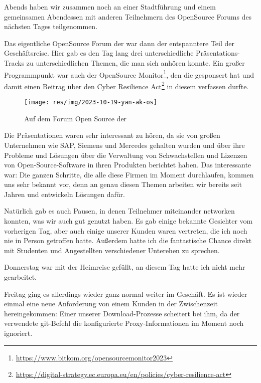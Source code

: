 Abends haben wir zusammen noch an einer Stadtführung und einem gemeinsamen Abendessen mit anderen Teilnehmern des OpenSource Forums des nächsten Tages teilgenommen.

Das eigentliche OpenSource Forum der \bitkom war dann der entspanntere Teil der Geschäftsreise.
Hier gab es den Tag lang drei unterschiedliche Präsentations-Tracks zu unterschiedlichen Themen, die man sich anhören konnte.
Ein großer Programmpunkt war auch der \bitkom OpenSource Monitor\footnote{\url{https://www.bitkom.org/opensourcemonitor2023}}, den die \metaeffekt gesponsert hat und damit einen Beitrag über den Cyber Resilience Act\footnote{\url{https://digital-strategy.ec.europa.eu/en/policies/cyber-resilience-act}} in diesem verfassen durfte.

\begin{figure}[htbp] %
    \centering
    \texttt{[image: res/img/2023-10-19-yan-ak-os]}
    \caption{Auf dem Forum Open Source der }
    \label{fig:yan-foss23}
\end{figure}

Die Präsentationen waren sehr interessant zu hören, da sie von großen Unternehmen wie SAP, Siemens und Mercedes gehalten wurden und über ihre Probleme und Lösungen über die Verwaltung von Schwachstellen und Lizenzen von Open-Source-Software in ihren Produkten berichtet haben.
Das interessante war: Die ganzen Schritte, die alle diese Firmen im Moment durchlaufen, kommen uns sehr bekannt vor, denn an genau diesen Themen arbeiten wir bereits seit Jahren und entwickeln Lösungen dafür.

Natürlich gab es auch Pausen, in denen Teilnehmer miteinander networken konnten, was wir auch gut genutzt haben.
Es gab einige bekannte Gesichter vom vorherigen Tag, aber auch einige unserer Kunden waren vertreten, die ich noch nie in Person getroffen hatte.
Außerdem hatte ich die fantastische Chance direkt mit Studenten und Angestellten verschiedener Unterehen zu sprechen.

Donnerstag war mit der Heimreise gefüllt, an diesem Tag hatte ich nicht mehr gearbeitet.

Freitag ging es allerdings wieder ganz normal weiter im Geschäft.
Es ist wieder einmal eine neue Anforderung von einem Kunden in der Zwischenzeit hereingekommen:
Einer unserer Download-Prozesse scheitert bei ihm, da der verwendete git-Befehl die konfigurierte Proxy-Informationen im Moment noch ignoriert.


